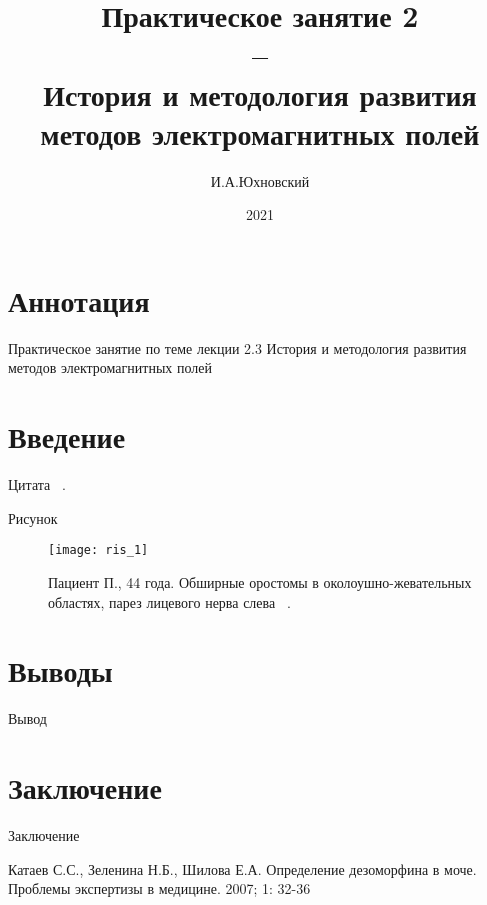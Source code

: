 \documentclass[11pt]{article}
\title{\textbf{Практическое занятие 2  \\ -- \\ 
		История и методология развития методов электромагнитных полей}}
\author{И.А.Юхновский}
\date{2021}
\begin{document}
	
	\maketitle
	\thispagestyle{empty}
	\section*{Аннотация}
	Практическое занятие по теме лекции 2.3 История и методология развития методов электромагнитных полей
	
	\tableofcontents{}
	
	\section{Введение}
 	Цитата  ~\cite{kataev}.
	
	Рисунок
	\begin{figure}[H]
		\centering
		\texttt{[image: ris\_1]}
		\caption{Пациент  П., 44 года. Обширные оростомы в околоушно-жевательных областях, парез лицевого нерва слева ~\cite{rsj}.}
		\label{fig:ris_1}
	\end{figure}
	
	\section{Выводы}
	Вывод
	
	\section{Заключение}
	Заключение
	
	\begin{thebibliography}{3}
		 Катаев С.С., Зеленина Н.Б., Шилова Е.А. Определение	дезоморфина в моче. Проблемы экспертизы в медицине.	2007; 1: 32-36 
		
	\end{thebibliography}
	
\end{document}
